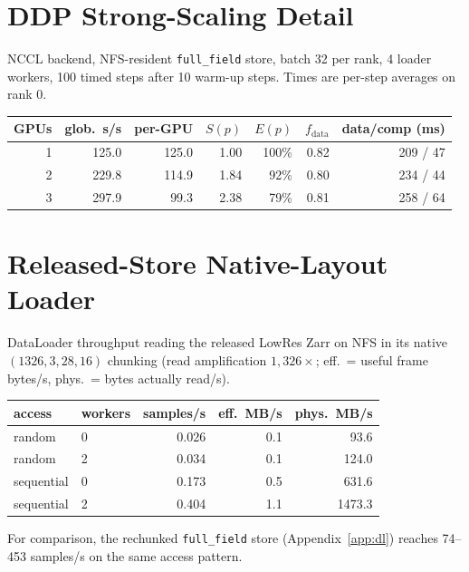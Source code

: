 \documentclass[conference]{IEEEtran}
\begin{document}
\section{DDP Strong-Scaling Detail}\label{app:ddp}
NCCL backend, NFS-resident \texttt{full\_field} store, batch 32 per rank, 4
loader workers, 100 timed steps after 10 warm-up steps. Times are per-step
averages on rank 0.
\begin{center}\small
\setlength{\tabcolsep}{3.5pt}
\begin{tabular}{@{}rrrrrrr@{}}
\toprule
GPUs & glob.\ s/s & per-GPU & $S(p)$ & $E(p)$ & $f_{\mathrm{data}}$ & data/comp (ms) \\
\midrule
1 & 125.0 & 125.0 & 1.00 & 100\% & 0.82 & 209 / 47 \\
2 & 229.8 & 114.9 & 1.84 & 92\%  & 0.80 & 234 / 44 \\
3 & 297.9 & 99.3  & 2.38 & 79\%  & 0.81 & 258 / 64 \\
\bottomrule
\end{tabular}
\end{center}

\section{Released-Store Native-Layout Loader}\label{app:loader}
DataLoader throughput reading the released LowRes Zarr on NFS in its native
$(1326,3,28,16)$ chunking (read amplification $1{,}326\times$; eff.\ = useful
frame bytes/s, phys.\ = bytes actually read/s).
\begin{center}\small
\begin{tabular}{@{}llrrr@{}}
\toprule
access & workers & samples/s & eff.\ MB/s & phys.\ MB/s \\
\midrule
random     & 0 & 0.026 & 0.1 & 93.6 \\
random     & 2 & 0.034 & 0.1 & 124.0 \\
sequential & 0 & 0.173 & 0.5 & 631.6 \\
sequential & 2 & 0.404 & 1.1 & 1473.3 \\
\bottomrule
\end{tabular}
\end{center}
For comparison, the rechunked \texttt{full\_field} store
(Appendix~\ref{app:dl}) reaches 74--453 samples/s on the same access pattern.
\end{document}
